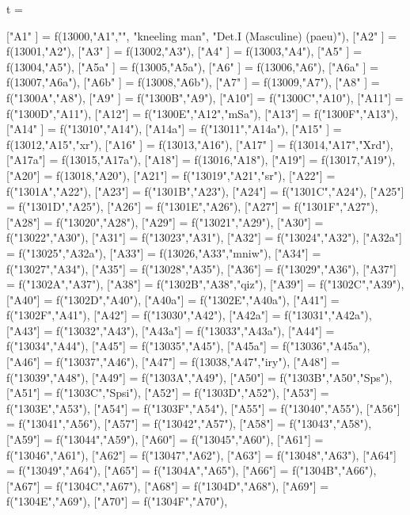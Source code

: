 \documentclass{article}
\begin{document}
\begin{luacode*}
t ={
   ["A1" 	]      =   f(13000,"A1","",
                      "kneeling man",
                      "Det.I (Masculine) (paeu)"),
   ["A2" 	] 		= f(13001,"A2"),
   ["A3" 	] 		= f(13002,"A3"),
	["A4" 	] 		= f(13003,"A4"),
   ["A5" 	]		= f(13004,"A5"),  
	["A5a"	] 		= f(13005,"A5a"),
	["A6"	]		= f(13006,"A6"),
	["A6a"	]		= f(13007,"A6a"),
	["A6b"	]		= f(13008,"A6b"),
   ["A7"	] 		= f(13009,"A7"),
	["A8"	] 		= f("1300A","A8"),
	["A9" 	] 		= f("1300B","A9"),
	["A10"] 		= f("1300C","A10"),
	["A11"] 		= f("1300D","A11"),
	["A12"] 		= f("1300E","A12","mSa"),
	["A13"] 		= f("1300F","A13"),
	["A14" ] 		= f("13010","A14"),
	["A14a"] 		= f("13011","A14a"),
  	["A15" ]		= f(13012,"A15","xr"),
  	["A16" ] 		= f(13013,"A16"),
  	["A17" ] 		= f(13014,"A17","Xrd"),
  	["A17a"] 		= f(13015,"A17a"),
  	["A18"] 		= f(13016,"A18"),
  	["A19"] 		= f(13017,"A19"),
  	["A20"] 		= f(13018,"A20"),
  	["A21"] 		= f("13019","A21","sr"),
  	["A22"] 		= f("1301A","A22"),
  	["A23"] 		= f("1301B","A23"),
  	["A24"] 		= f("1301C","A24"),
  	["A25"] 		= f("1301D","A25"),
  	["A26"] 		= f("1301E","A26"),
  	["A27"] 		= f("1301F","A27"),
  	["A28"] 		= f("13020","A28"),
  	["A29"] 		= f("13021","A29"),
  	["A30"] 		= f("13022","A30"),
  	["A31"] 		= f("13023","A31"),
  	["A32"] 		= f("13024","A32"),
 	["A32a"] 		= f("13025","A32a"),
  	["A33"] 		= f(13026,"A33","mniw"),
	["A34"] 		= f("13027","A34"),
	["A35"] 		= f("13028","A35"),
	["A36"] 		= f("13029","A36"),
	["A37"] 		= f("1302A","A37"),
	["A38"] 		= f("1302B","A38","qiz"),
	["A39"] 		= f("1302C","A39"),
	["A40"] 		= f("1302D","A40"),
	["A40a"] 		= f("1302E","A40a"),
	["A41"] 		= f("1302F","A41"),
	["A42"] 		= f("13030","A42"),
	["A42a"] 		= f("13031","A42a"),
	["A43"] 		= f("13032","A43"),
	["A43a"] 		= f("13033","A43a"),
	["A44"] 		= f("13034","A44"),
	["A45"] 		= f("13035","A45"),
	["A45a"] 		= f("13036","A45a"),
	["A46"] 		= f("13037","A46"),
  	["A47"] 		= f(13038,"A47","iry"),
	["A48"] 		= f("13039","A48"),
	["A49"] 		= f("1303A","A49"),
  	["A50"] 		= f("1303B","A50","Sps"),
  	["A51"] 		= f("1303C","Spsi"),
	["A52"] 		= f("1303D","A52"),
	["A53"] 		= f("1303E","A53"),
	["A54"] 		= f("1303F","A54"),
	["A55"] 		= f("13040","A55"),
	["A56"] 		= f("13041","A56"),
	["A57"] 		= f("13042","A57"),
	["A58"] 		= f("13043","A58"),
	["A59"] 		= f("13044","A59"),
	["A60"] 		= f("13045","A60"),
	["A61"] 		= f("13046","A61"),
	["A62"] 		= f("13047","A62"),
	["A63"] 		= f("13048","A63"),
	["A64"] 		= f("13049","A64"),
	["A65"] 		= f("1304A","A65"),
	["A66"] 		= f("1304B","A66"),
	["A67"] 		= f("1304C","A67"),
	["A68"] 		= f("1304D","A68"),
	["A69"] 		= f("1304E","A69"),
	["A70"] 		= f("1304F","A70"),

}
\end{luacode*}
\end{document}
